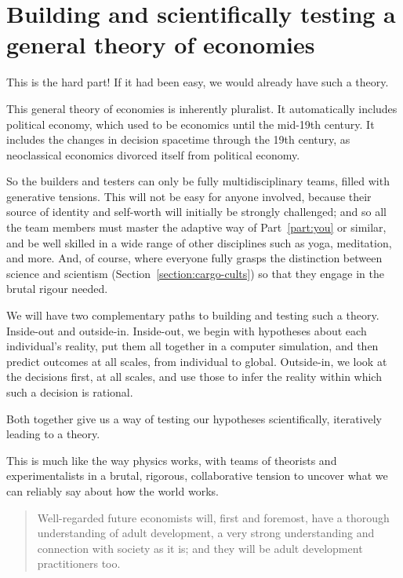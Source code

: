\section*{Building and scientifically testing a general theory of economies}
This is the hard part! If it had been easy, we would already have such a theory.


This general theory of economies is inherently pluralist.  It automatically includes political economy, which used to be economics until the mid-19th century. It includes the changes in decision spacetime through the 19th century, as neoclassical economics divorced itself from political economy.


So the builders and testers can only be fully multidisciplinary teams, filled with generative tensions. This will not be easy for anyone involved, because their source of identity and self\hyp{}worth will initially be strongly challenged; and so all the team members must master the adaptive way of Part~\ref{part:you} or similar, and be well skilled in a wide range of other disciplines such as yoga, meditation, and more. And, of course, where everyone fully grasps the distinction between science and scientism (Section~\ref{section:cargo-cults}) so that they engage in the brutal rigour needed.


We will have two complementary paths to building and testing such a theory. Inside\hyp{}out and outside\hyp{}in. Inside\hyp{}out, we begin with hypotheses about each individual’s reality, put them all together in a computer simulation, and then predict outcomes at all scales, from individual to global. Outside\hyp{}in, we look at the decisions first, at all scales,  and use those to infer the reality within which such a decision is rational. 


Both together give us a way of testing our hypotheses scientifically, iteratively leading to a theory. 


This is much like the way physics  works, with teams of theorists and experimentalists in a brutal, rigorous, collaborative tension to uncover what we can reliably say about how the world works. 


\begin{quotation}
Well\hyp{}regarded future economists will, first and foremost, have a thorough understanding of adult development, a very strong understanding and connection with society as it is; and they will be adult development practitioners too. 
\end{quotation}


